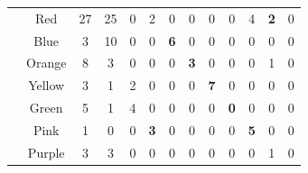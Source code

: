 \begin{table}[!ht]
{\begin{tabular}{ccccccccccccc}
\multicolumn{1}{|l|}{} & \multicolumn{1}{c|}{Red} & \multicolumn{1}{c|}{27} & \multicolumn{1}{c|}{25} & \multicolumn{1}{c|}{0} & \multicolumn{1}{c|}{2} & \multicolumn{1}{c|}{0} & \multicolumn{1}{c|}{0} & \multicolumn{1}{c|}{0} & \multicolumn{1}{c|}{0} & \multicolumn{1}{c|}{4} & \multicolumn{1}{c|}{\cellcolor[HTML]{FE0000}\textbf{2}} & \multicolumn{1}{c|}{0} \\ \cline{2-13}
\multicolumn{1}{|l|}{} & \multicolumn{1}{c|}{Blue} & \multicolumn{1}{c|}{3} & \multicolumn{1}{c|}{10} & \multicolumn{1}{c|}{0} & \multicolumn{1}{c|}{0} & \multicolumn{1}{c|}{\cellcolor[HTML]{32CB00}\textbf{6}} & \multicolumn{1}{c|}{0} & \multicolumn{1}{c|}{0} & \multicolumn{1}{c|}{0} & \multicolumn{1}{c|}{0} & \multicolumn{1}{c|}{0} & \multicolumn{1}{c|}{0} \\ \cline{2-13}
\multicolumn{1}{|l|}{} & \multicolumn{1}{c|}{Orange} & \multicolumn{1}{c|}{8} & \multicolumn{1}{c|}{3} & \multicolumn{1}{c|}{0} & \multicolumn{1}{c|}{0} & \multicolumn{1}{c|}{0} & \multicolumn{1}{c|}{\cellcolor[HTML]{32CB00}\textbf{3}} & \multicolumn{1}{c|}{0} & \multicolumn{1}{c|}{0} & \multicolumn{1}{c|}{0} & \multicolumn{1}{c|}{1} & \multicolumn{1}{c|}{0} \\ \cline{2-13}
\multicolumn{1}{|l|}{} & \multicolumn{1}{c|}{Yellow}    & \multicolumn{1}{c|}{3} & \multicolumn{1}{c|}{1} & \multicolumn{1}{c|}{2} & \multicolumn{1}{c|}{0} & \multicolumn{1}{c|}{0} & \multicolumn{1}{c|}{0} & \multicolumn{1}{c|}{\cellcolor[HTML]{32CB00}\textbf{7}} & \multicolumn{1}{c|}{0} & \multicolumn{1}{c|}{0} & \multicolumn{1}{c|}{0} & \multicolumn{1}{c|}{0} \\ \cline{2-13}
\multicolumn{1}{|l|}{} & \multicolumn{1}{c|}{Green} & \multicolumn{1}{c|}{5} & \multicolumn{1}{c|}{1} & \multicolumn{1}{c|}{4} & \multicolumn{1}{c|}{0} & \multicolumn{1}{c|}{0} & \multicolumn{1}{c|}{0} & \multicolumn{1}{c|}{0} & \multicolumn{1}{c|}{\cellcolor[HTML]{C0C0C0}\textbf{0}} & \multicolumn{1}{c|}{0} & \multicolumn{1}{c|}{0} & \multicolumn{1}{c|}{0} \\ \cline{2-13}
\multicolumn{1}{|l|}{} & \multicolumn{1}{c|}{Pink} & \multicolumn{1}{c|}{1} & \multicolumn{1}{c|}{0} & \multicolumn{1}{c|}{0} & \multicolumn{1}{c|}{\cellcolor[HTML]{FE0000}\textbf{3}} & \multicolumn{1}{c|}{0} & \multicolumn{1}{c|}{0} & \multicolumn{1}{c|}{0} & \multicolumn{1}{c|}{0} & \multicolumn{1}{c|}{\cellcolor[HTML]{32CB00}\textbf{5}} & \multicolumn{1}{c|}{0} & \multicolumn{1}{c|}{0} \\ \cline{2-13}
\multicolumn{1}{|l|}{} & \multicolumn{1}{c|}{Purple} & \multicolumn{1}{c|}{3} & \multicolumn{1}{c|}{3} & \multicolumn{1}{c|}{0} & \multicolumn{1}{c|}{0} & \multicolumn{1}{c|}{0} & \multicolumn{1}{c|}{0} & \multicolumn{1}{c|}{0} & \multicolumn{1}{c|}{0} & \multicolumn{1}{c|}{0} & \multicolumn{1}{c|}{1} & \multicolumn{1}{c|}{0} \\ \cline{2-13}

\end{tabular}}
\end{table}
